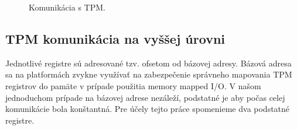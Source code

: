 \begin{figure}
    \centering
    \vfill
    \vfill
    \vfill
    \caption[Komunikácia s TPM]{Komunikácia s TPM.}
    \label{obr:tpmRW}
\end{figure}

\subsection{TPM komunikácia na vyššej úrovni}
Jednotlivé registre sú adresované tzv. ofsetom od bázovej adresy. Bázová adresa sa na platformách zvykne využívať na zabezpečenie správneho mapovania TPM registrov do pamäte v prípade použitia memory mapped I/O. V našom jednoduchom prípade na bázovej adrese nezáleží, podstatné je aby počas celej komunikácie bola konštantná. Pre účely tejto práce spomenieme dva podstatné registre.

